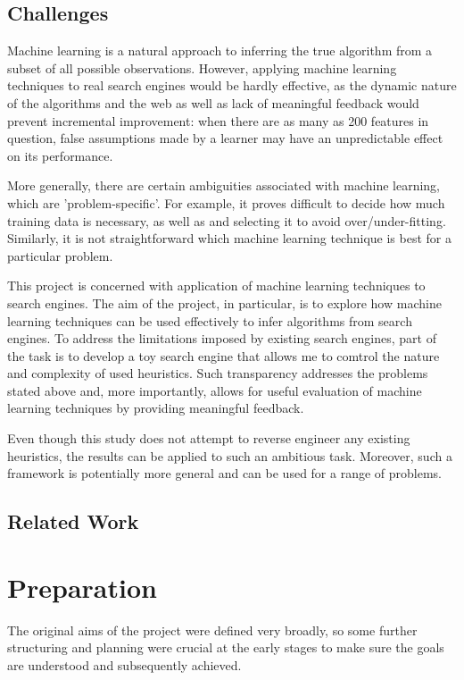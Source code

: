 \documentclass[12pt,notitlepage,twoside]{scrreprt}
\begin{document}
\section{Challenges}
Machine learning is a natural approach to inferring the true algorithm from a
subset of all possible observations. However, applying machine learning
techniques to real search engines would be hardly effective, as the dynamic
nature of the algorithms and the web as well as lack of meaningful feedback
would prevent incremental improvement: when there are as many as 200 features
in question, false assumptions made by a learner may have an unpredictable
effect on its performance.

More generally, there are certain ambiguities associated with machine learning,
which are 'problem-specific'. For example, it proves difficult to decide how
much training data is necessary, as well as and selecting it to avoid
over/under-fitting\cite{domingos}. Similarly, it is not straightforward which
machine learning technique is best for a particular problem.

This project is concerned with application of machine learning techniques to
search engines. The aim of the project, in particular,  is to explore how
machine learning techniques can be used effectively to infer algorithms from
search engines. To address the limitations imposed by existing search engines,
part of the task is to develop a toy search engine that allows me to comtrol
the nature and complexity of used heuristics. Such transparency addresses the
problems stated above and, more importantly,  allows for useful evaluation of
machine learning techniques by providing meaningful feedback.

Even though this study does not attempt to reverse engineer any existing
heuristics, the results can be applied to such an ambitious task.
Moreover, such a framework is potentially more general and can be used for a
range of problems.

\section{Related Work}

\newcommand\todo[1]{\textcolor{red}{\textbf{TODO: #1}}}

\cleardoublepage
\chapter{Preparation}
The original aims of the project were defined very broadly, so some further structuring and
planning were crucial at the early stages to make sure the goals are understood and
subsequently achieved.
\end{document}
